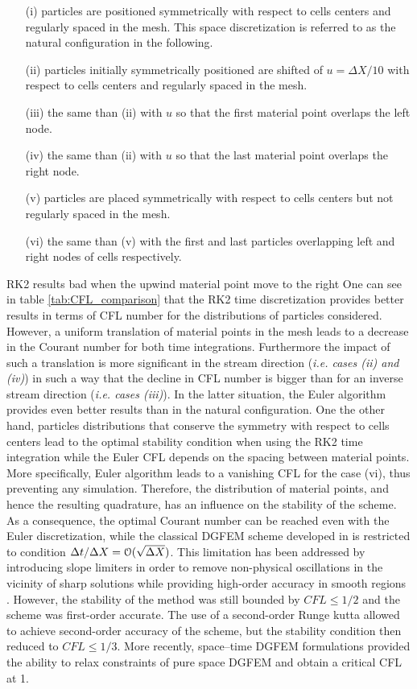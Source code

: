 \begin{itemize}
\item[(i)] particles are positioned symmetrically with respect to cells centers and regularly spaced in the mesh. This space discretization is referred to as the natural configuration in the following.
\item[(ii)] particles initially symmetrically positioned are shifted of $u=\Delta X/10$ with respect to cells centers and regularly spaced in the mesh.
\item[(iii)] the same than (ii) with $u$ so that the first material point overlaps the left node.
\item[(iv)] the same than (ii) with $u$ so that the last material point overlaps the right node.
\item[(v)] particles are placed symmetrically with respect to cells centers but not regularly spaced in the mesh.
\item[(vi)] the same than (v) with the first and last particles overlapping left and right nodes of cells respectively.
\end{itemize}
RK2 results bad when the upwind material point move to the right
One can see in table \ref{tab:CFL_comparison} that the RK2 time discretization provides better results in terms of CFL number for the distributions of particles considered. However, a uniform translation of material points in the mesh leads to a decrease in the Courant number for both time integrations. Furthermore the impact of such a translation is more significant in the stream direction (\textit{i.e. cases (ii) and (iv)}) in such a way that the decline in CFL number is bigger than for an inverse stream direction (\textit{i.e. cases (iii)}). In the latter situation, the Euler algorithm provides even better results than in the natural configuration. One the other hand, particles distributions that conserve the symmetry with respect to cells centers lead to the optimal stability condition when using the RK2 time integration while the Euler CFL depends on the spacing between material points. More specifically, Euler algorithm leads to a vanishing CFL for the case (vi), thus preventing any simulation. Therefore, the distribution of material points, and hence the resulting quadrature, has an influence on the stability of the scheme. As a consequence, the optimal Courant number can be reached even with the Euler discretization, while the classical DGFEM scheme developed in \cite{Chavent_Salzano} is restricted to condition $\Delta t / \Delta X = \mathcal{O}(\sqrt{\Delta X})$. This limitation has been addressed by introducing slope limiters in order to remove non-physical oscillations in the vicinity of sharp solutions while providing high-order accuracy in smooth regions \cite{Chavent_Cockburn}. However, the stability of the method was still bounded by $CFL\leq 1/2$ and the scheme was first-order accurate. The use of a second-order Runge kutta \cite{DGFEM_CFL} allowed to achieve second-order accuracy of the scheme, but the stability condition then reduced to $CFL\leq1/3$. More recently, space–time DGFEM formulations \cite{ST_DGFEM1,ST_DGFEM2} provided the ability to relax constraints of pure space DGFEM and obtain a critical CFL at 1.

